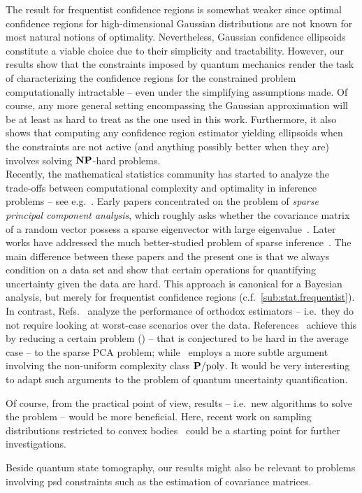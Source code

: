 The result for frequentist confidence regions is somewhat weaker since optimal confidence regions for high-dimensional Gaussian distributions are not known for most natural notions of optimality.
Nevertheless, Gaussian confidence ellipsoids constitute a viable choice due to their simplicity and tractability.
However, our results show that the constraints imposed by quantum mechanics render the task of characterizing the confidence regions for the constrained problem computationally intractable -- even under the simplifying assumptions made.
Of course, any more general setting encompassing the Gaussian approximation will be at least as hard to treat as the one used in this work.
Furthermore, it also shows that computing any confidence region estimator yielding ellipsoids when the constraints are not active (and anything possibly better when they are) involves solving $\NP$-hard problems.\\


Recently, the mathematical statistics community has started to analyze the trade-offs between computational complexity and optimality in inference problems -- see e.g.~\cite{Berthet_2013_Complexity,Berthet_2013_Computational,Zhang_2014_Lower}.
Early papers concentrated on the problem of \emph{sparse principal component analysis}, which roughly asks whether the covariance matrix of a random vector possess a sparse eigenvector with large eigenvalue~\cite{Berthet_2013_Complexity,Berthet_2013_Computational,Zhang_2014_Lower}.
Later works have addressed the much better-studied problem of sparse inference~\cite{Zhang_2014_Lower}.
The main difference between these papers and the present one is that we always condition on a data set and show that certain operations for quantifying uncertainty given the data are hard.
This approach is canonical for a Bayesian analysis, but merely  for frequentist confidence regions (c.f.\ \cref{sub:stat.frequentist}).
In contrast, Refs.~\cite{Berthet_2013_Complexity,Berthet_2013_Computational,Zhang_2014_Lower} analyze the  performance of orthodox estimators -- i.e.\ they do not require looking at worst-case scenarios over the data.
References~\cite{Berthet_2013_Complexity,Berthet_2013_Computational,Zhang_2014_Lower} achieve this by reducing a certain problem () -- that is conjectured to be hard in the average case -- to the sparse PCA problem; while~\cite{Zhang_2014_Lower} employs a more subtle argument involving the non-uniform complexity class $\P/\mathrm{poly}$.
It would be very interesting to adapt such arguments to the problem of quantum uncertainty quantification.


Of course, from the practical point of view,  results -- i.e.\ new algorithms to solve the problem -- would be more beneficial.
Here, recent work on sampling distributions restricted to convex bodies~\cite{Cousins_2013_Cubic,Cousins_2015_Bypassing} could be a starting point for further investigations.

Beside quantum state tomography, our results might also be relevant to problems involving psd constraints such as the estimation of covariance matrices.

